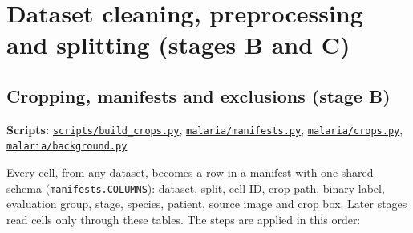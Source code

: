 \documentclass[11pt,a4paper]{article}
\begin{document}
\section{Dataset cleaning, preprocessing and splitting (stages B and C)}

\subsection{Cropping, manifests and exclusions (stage B)}

\textbf{Scripts:} \href{https://github.com/noahtjonsk/malaria-cross-dataset/blob/main/scripts/build_crops.py}{\texttt{scripts/\allowbreak{}build\_\allowbreak{}crops.\allowbreak{}py}}, \href{https://github.com/noahtjonsk/malaria-cross-dataset/blob/main/malaria/manifests.py}{\texttt{malaria/\allowbreak{}manifests.\allowbreak{}py}}, \href{https://github.com/noahtjonsk/malaria-cross-dataset/blob/main/malaria/crops.py}{\texttt{malaria/\allowbreak{}crops.\allowbreak{}py}}, \href{https://github.com/noahtjonsk/malaria-cross-dataset/blob/main/malaria/background.py}{\texttt{malaria/\allowbreak{}background.\allowbreak{}py}}

Every cell, from any dataset, becomes a row in a manifest with one shared schema (\texttt{manifests.\allowbreak{}COLUMNS}): dataset, split, cell ID, crop path, binary label, evaluation group, stage, species, patient, source image and crop box. Later stages read cells only through these tables. The steps are applied in this order:
\end{document}
